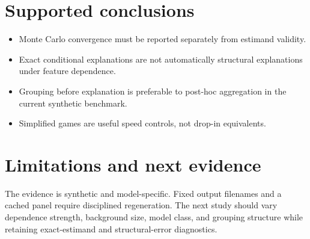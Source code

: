 \documentclass[10pt,a4paper]{article}
\begin{document}
\section{Supported conclusions}
\begin{itemize}
\item Monte Carlo convergence must be reported separately from estimand
      validity.
\item Exact conditional explanations are not automatically structural
      explanations under feature dependence.
\item Grouping before explanation is preferable to post-hoc aggregation in the
      current synthetic benchmark.
\item Simplified games are useful speed controls, not drop-in equivalents.
\end{itemize}

\section{Limitations and next evidence}
The evidence is synthetic and model-specific. Fixed output filenames and a
cached panel require disciplined regeneration. The next study should vary
dependence strength, background size, model class, and grouping structure while
retaining exact-estimand and structural-error diagnostics.
\end{document}
